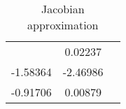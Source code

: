 
    \begin{table}\caption{Jacobian approximation}
\centering
    \begin{tabular}{|l|c|c|}
    \toprule
    \miderule202 & 0.02237\\
-1.58364 & -2.46986\\
-0.91706 & 0.00879\\

      \bottomrule
      \end{tabular}
      \end{table}